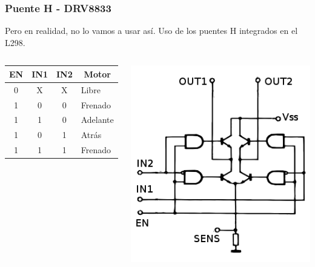 \documentclass[compress]{beamer}
\begin{document}
\begin{frame}
 \frametitle{Puente H - DRV8833}
Pero en realidad, no lo vamos a usar así. Uso de los puentes H integrados en el L298.
\begin{columns} 
{%
\begin{center}
\begin{tabular}{|c|c|c|l|}\hline
\textbf{EN} & \textbf{IN1} & \textbf{IN2} & \multicolumn{1}{c|}{\textbf{Motor}}\\\hline
0 & X & X & Libre\\\hline
1 & 0 & 0 & Frenado\\\hline
1 & 1 & 0 & Adelante\\\hline
1 & 0 & 1 & Atrás\\\hline
1 & 1 & 1 & Frenado\\\hline
\end{tabular}
\end{center}
}%
 \begin{center}
 \includegraphics[width=\columnwidth]{./img/l298image.png}
\end{center}
\end{columns}
\end{frame}
\end{document}
